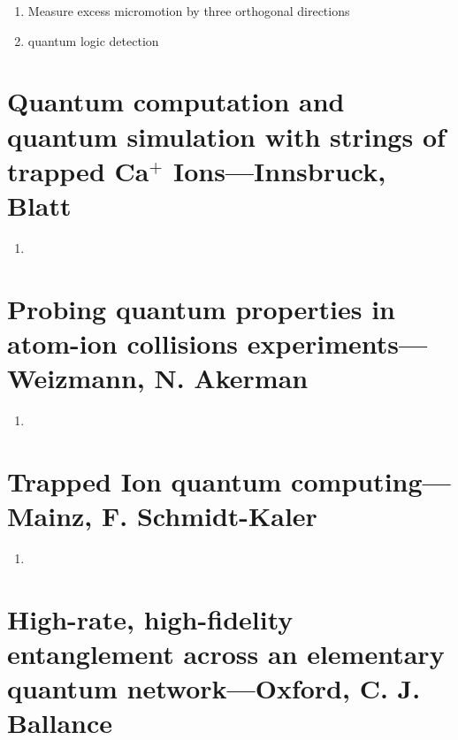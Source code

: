 \begin{enumerate}
    \item Measure excess micromotion by three orthogonal directions
    \item quantum logic detection
\end{enumerate}


\section{Quantum computation and quantum simulation with strings of trapped Ca$^+$ Ions---Innsbruck, Blatt} %
\label{sec:quantum_computation_and_quantum_simulation_with_strings_of_trapped_ca}


\begin{enumerate}
    \item
\end{enumerate}





\section{Probing quantum properties in atom-ion collisions experiments---Weizmann, N. Akerman} %
\label{sec:probing_quantum_properties_in_atom_ion_collisions_experiments_weizmann_n_akerman}



\begin{enumerate}
    \item
\end{enumerate}



\section{Trapped Ion quantum computing---Mainz, F. Schmidt-Kaler} %
\label{sec:trapped_ion_quantum_computing_mainz_f_schmidt_kaler}


\begin{enumerate}
    \item
\end{enumerate}



\section{High-rate, high-fidelity entanglement across an elementary quantum network---Oxford, C. J. Ballance} %
\label{sec:high_rate_high_fidelity_entanglement_across_an_elementary_quantum_network_oxford_c_j_ballance}



